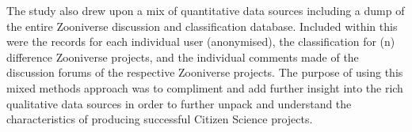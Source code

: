 \documentclass{sigchi}
\begin{document}
The study also drew upon a mix of quantitative data sources including a dump of the entire Zooniverse discussion and classification database. Included within this were the records for each individual user (anonymised), the classification for (n) difference Zooniverse projects, and the individual comments made of the discussion forums of the respective Zooniverse projects. The purpose of using this mixed methods approach was to compliment and add further insight into the rich qualitative data sources \cite{EdwardsCrossley2009} in order to further unpack and understand the characteristics of producing successful Citizen Science projects.



\end{document}
